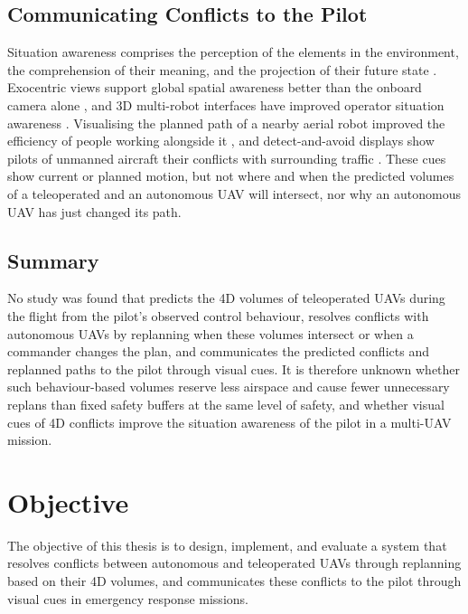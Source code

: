 \documentclass{article}
\begin{document}
\subsection{Communicating Conflicts to the Pilot}
Situation awareness comprises the perception of the elements in the environment, the comprehension of their meaning, and the projection of their future state \cite{endsley1995}.
Exocentric views support global spatial awareness better than the onboard camera alone \cite{pavlovic2009}, and 3D multi-robot interfaces have improved operator situation awareness \cite{roldan2017}.
Visualising the planned path of a nearby aerial robot improved the efficiency of people working alongside it \cite{walker2018ar}, and detect-and-avoid displays show pilots of unmanned aircraft their conflicts with surrounding traffic \cite{monk2018wellclear}.
These cues show current or planned motion, but not where and when the predicted volumes of a teleoperated and an autonomous UAV will intersect, nor why an autonomous UAV has just changed its path.

\subsection{Summary}
No study was found that predicts the 4D volumes of teleoperated UAVs during the flight from the pilot's observed control behaviour, resolves conflicts with autonomous UAVs by replanning when these volumes intersect or when a commander changes the plan, and communicates the predicted conflicts and replanned paths to the pilot through visual cues.
It is therefore unknown whether such behaviour-based volumes reserve less airspace and cause fewer unnecessary replans than fixed safety buffers at the same level of safety, and whether visual cues of 4D conflicts improve the situation awareness of the pilot in a multi-UAV mission.

\section{Objective}
The objective of this thesis is to design, implement, and evaluate a system that resolves conflicts between autonomous and teleoperated UAVs through replanning based on their 4D volumes, and communicates these conflicts to the pilot through visual cues in emergency response missions.
\end{document}

